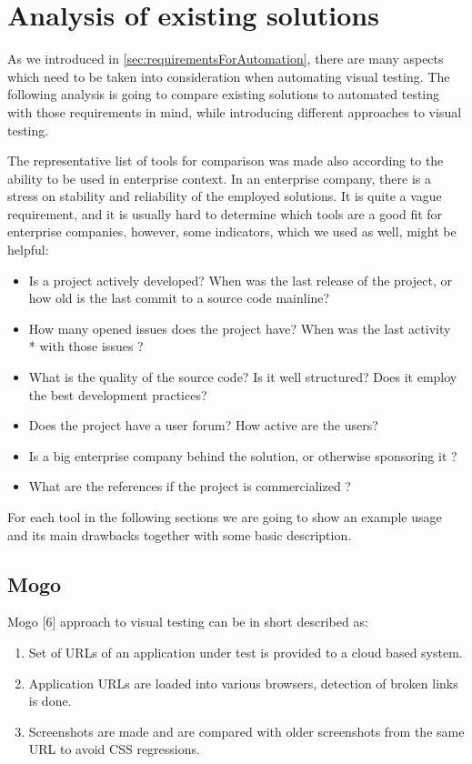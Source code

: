 \documentclass[11pt,oneside,final]{fithesis2}
\begin{document}
    
\chapter{Analysis of existing solutions}
\label{chap:analysis}
As we introduced in \ref{sec:requirementsForAutomation}, there are many aspects which need to be taken into consideration when automating visual
testing. The following analysis is going to compare existing solutions to automated testing with those requirements in mind, while introducing
different approaches to visual testing.

The representative list of tools for comparison was made also according to the ability to be used in enterprise context. In an enterprise company, there
is a stress on stability and reliability of the employed solutions. It is quite a vague requirement, and it is usually hard to determine which tools
are a good fit for enterprise companies, however, some indicators, which we used as well, might be helpful:
\begin{itemize}
 \item Is a project actively developed? When was the last release of the project, or how old is the last commit to a source code mainline?
 \item How many opened issues does the project have? When was the last activity \\* with those issues ?
 \item What is the quality of the source code? Is it well structured? Does it employ the best development practices?
 \item Does the project have a user forum? How active are the users?
 \item Is a big enterprise company behind the solution, or otherwise sponsoring it ?
 \item What are the references if the project is commercialized ?
\end{itemize}

For each tool in the following sections we are going to show an example usage and its main drawbacks together with some basic description.
  
  \section{Mogo}
  Mogo [6] approach to visual testing can be in short described as: 
  \begin{enumerate}
   \item Set of URLs of an application under test is provided to a cloud based system.
   \item Application URLs are loaded into various browsers, detection of broken links is done.
   \item Screenshots are made and are compared with older screenshots from the same URL to avoid CSS regressions.
  \end{enumerate}
  
\end{document}
